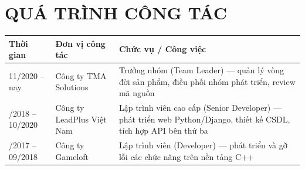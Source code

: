\clearpage

\section*{QUÁ TRÌNH CÔNG TÁC}

\vspace{0.8em}

\noindent
\begin{tabular}{@{}p{2.6cm}p{5.0cm}p{6.6cm}@{}}
\toprule
\textbf{Thời gian} & \textbf{Đơn vị công tác} & \textbf{Chức vụ / Công việc} \\
\midrule
11/2020 -- nay & Công ty TMA Solutions & Trưởng nhóm (Team Leader) --- quản lý vòng đời sản phẩm, điều phối nhóm phát triển, review mã nguồn \\
\addlinespace
10/2018 -- 10/2020 & Công ty LeadPlus Việt Nam & Lập trình viên cao cấp (Senior Developer) --- phát triển web Python/Django, thiết kế CSDL, tích hợp API bên thứ ba \\
\addlinespace
10/2017 -- 09/2018 & Công ty Gameloft & Lập trình viên (Developer) --- phát triển và gỡ lỗi các chức năng trên nền tảng C++ \\
\bottomrule
\end{tabular}